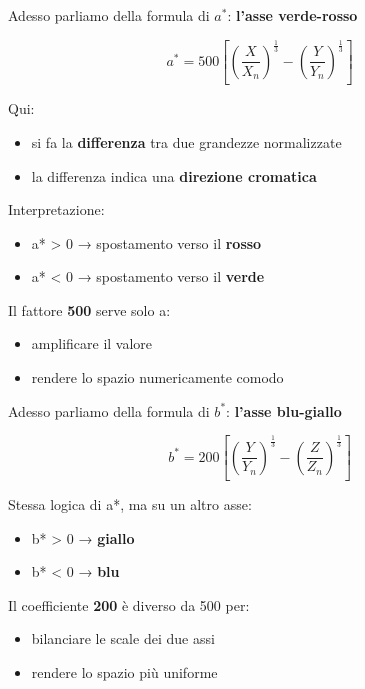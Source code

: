 \documentclass[
]{article}
\providecommand{\tightlist}{%
  \setlength{\itemsep}{0pt}\setlength{\parskip}{0pt}}
\begin{document}
Adesso parliamo della formula di \(a^*\): \textbf{l'asse verde-rosso}

\[
a^* = 500 \left[ \left( \frac{X}{X_n} \right)^{\frac{1}{3}} - \left( \frac{Y}{Y_n} \right)^{\frac{1}{3}} \right]
\]

Qui:

\begin{itemize}
\tightlist
\item
  si fa la \textbf{differenza} tra due grandezze normalizzate
\item
  la differenza indica una \textbf{direzione cromatica}
\end{itemize}

Interpretazione:

\begin{itemize}
\tightlist
\item
  a* \textgreater{} 0 → spostamento verso il \textbf{rosso}
\item
  a* \textless{} 0 → spostamento verso il \textbf{verde}
\end{itemize}

Il fattore \textbf{500} serve solo a:

\begin{itemize}
\tightlist
\item
  amplificare il valore
\item
  rendere lo spazio numericamente comodo
\end{itemize}

Adesso parliamo della formula di \(b^*\): \textbf{l'asse blu-giallo}

\[
b^* = 200 \left[ \left( \frac{Y}{Y_n} \right)^{\frac{1}{3}} - \left( \frac{Z}{Z_n} \right)^{\frac{1}{3}} \right]
\]

Stessa logica di a*, ma su un altro asse:

\begin{itemize}
\tightlist
\item
  b* \textgreater{} 0 → \textbf{giallo}
\item
  b* \textless{} 0 → \textbf{blu}
\end{itemize}

Il coefficiente \textbf{200} è diverso da 500 per:

\begin{itemize}
\tightlist
\item
  bilanciare le scale dei due assi
\item
  rendere lo spazio più uniforme
\end{itemize}
\end{document}
